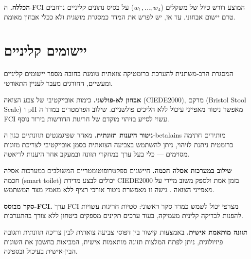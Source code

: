 \begin{hebrew}\textbf{הכללה.} ה-\textenglish{FCI} המוצע דורש כיול של משקלים ($w_1,\dots,w_4$) על בסיס נתונים קליניים נרחבים טרם יישום אבחוני. עד אז, יש לפרש את המדד כמסגרת מושגית ולא ככלי אבחון מאומת.\end{hebrew}

\section{\texthebrew{יישומים קליניים}}

\begin{hebrew}המסגרת הרב-משתנית להערכת כרומטיקה צואתית טומנת בחובה מספר יישומים קליניים ומעשיים, החורגים מעבר לעניין התאורטי.\end{hebrew}

\begin{hebrew}\textbf{אבחון לא-פולשני.} כימות אובייקטיבי של צבע הצואה (\textenglish{CIEDE2000}), מרקם (\textenglish{Bristol Stool Scale}) ו-\textenglish{pH} מאפשר ניטור מאפייני עיכול ללא הליכים פולשניים. שילוב הפרמטרים במדד ה-\textenglish{FCI} עשוי לסייע בזיהוי מוקדם של חריגות הדורשות בירור נוסף.\end{hebrew}

\begin{hebrew}\textbf{ניטור היענות תזונתית.} מאחר שפיגמנטים תזונתיים כגון ה-\textenglish{betalains} מותירים חתימה כרומטית ניתנת לזיהוי, ניתן להשתמש בצביעה הצואתית כסמן אובייקטיבי לצריכת מזונות מסוימים — כלי בעל ערך במחקרי תזונה ובמעקב אחר היענות לדיאטה.\end{hebrew}

\begin{hebrew}\textbf{שילוב במערכות אסלה חכמה.} חיישנים ספקטרופוטומטריים המשולבים במערכות אסלה חכמה (\textenglish{smart toilet}) יכולים לבצע מדידת \textenglish{CIEDE2000} בזמן אמת ולספק משוב מיידי על מאפייני הצואה \cite{park2020}. גישה זו מאפשרת ניטור אורכי רציף ללא מאמץ מצד המשתמש.\end{hebrew}

\begin{hebrew}\textbf{סקר מבוסס-\textenglish{FCI}.} ערך \textenglish{FCI} מצרפי יכול לשמש כמדד סקר ראשוני: סטיות חריגות עשויות להפנות לבדיקה קלינית מעמיקה, בעוד ערכים תקינים מספקים ביטחון ללא צורך בהתערבות.\end{hebrew}

\begin{hebrew}\textbf{תזונה מותאמת אישית.} באמצעות קישור בין דפוסי צביעה צואתית לבין צריכה תזונתית ותגובה פיזיולוגית, ניתן לפתח המלצות תזונה מותאמות אישית, המביאות בחשבון את השונות הבין-אישית בעיכול ובספיגה.\end{hebrew}

